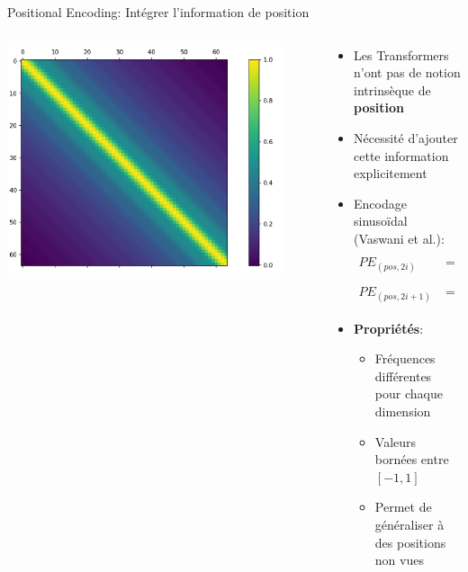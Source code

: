 \documentclass[aspectratio=169]{beamer}
\begin{document}
\begin{frame}{Positional Encoding: Intégrer l'information de position}
    \begin{columns}
        \begin{column}{0.5\textwidth}
            \begin{center}
                \includegraphics[width=0.9\textwidth]{images/position_matrix.png}
            \end{center}
        \end{column}
        \begin{column}{0.5\textwidth}
            \begin{itemize}
                \item Les Transformers n'ont pas de notion intrinsèque de \textbf{position}
                \item Nécessité d'ajouter cette information explicitement
                \item Encodage sinusoïdal (Vaswani et al.):
                \begin{align*}
                    PE_{(pos,2i)} &= \sin(pos/10000^{2i/d}) \\
                    PE_{(pos,2i+1)} &= \cos(pos/10000^{2i/d})
                \end{align*}
                \item \textbf{Propriétés}:
                \begin{itemize}
                    \item Fréquences différentes pour chaque dimension
                    \item Valeurs bornées entre $[-1,1]$
                    \item Permet de généraliser à des positions non vues
                \end{itemize}
            \end{itemize}
        \end{column}
    \end{columns}
\end{frame}
\end{document}
